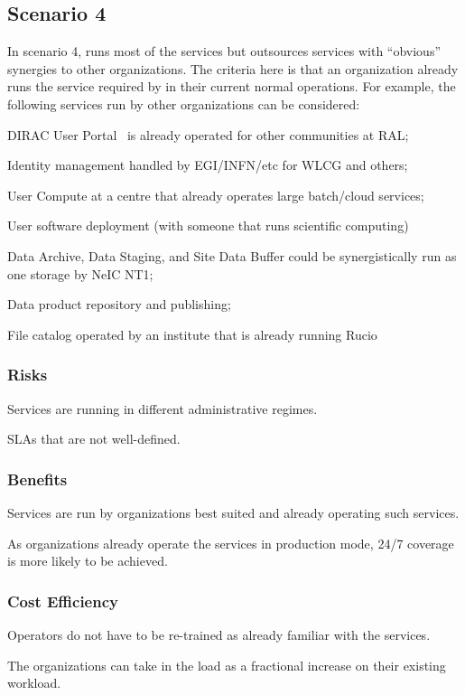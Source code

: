 \documentclass[12pt,a4paper]{article}
\begin{document}
\subsection{Scenario 4}
\label{ssec:scen4}

In scenario 4, \EC runs most of the services but outsources services with ``obvious'' synergies to other organizations.
The criteria here is that an organization already runs the service required by \ED in their current normal operations.
For example, the following services run by other organizations can be considered:
\bitm
  \item DIRAC User Portal~\cite{dirac} is already operated for other communities at RAL;
  \item Identity management handled by EGI/INFN/etc for WLCG and others;
  \item User Compute at a centre that already operates large batch/cloud services;
  \item User software deployment (with someone that runs scientific computing)
  \item Data Archive, Data Staging, and Site Data Buffer could be synergistically run as one storage by NeIC NT1;
  \item Data product repository and publishing;
  \item File catalog operated by an institute that is already running Rucio~\cite{rucio}
\eitm
  
\subsubsection*{Risks}
\bitm
\item Services are running in different administrative regimes.
  \item SLAs that are not well-defined. 
\eitm

\subsubsection*{Benefits}
\bitm
\item Services are run by organizations best suited and already operating such services.
  \item As organizations already operate the services in production mode, 24/7 coverage is more likely to be achieved.
\eitm

\subsubsection*{Cost Efficiency}
\bitm
\item Operators do not have to be re-trained as already familiar with the services.
\item The organizations can take in the \ED load as a fractional increase on their existing workload.
\eitm
\end{document}
